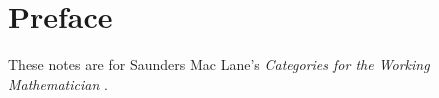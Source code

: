 \section*{Preface}

These notes are for Saunders Mac Lane's \textit{Categories for the Working Mathematician} \cite{cfwm}.
